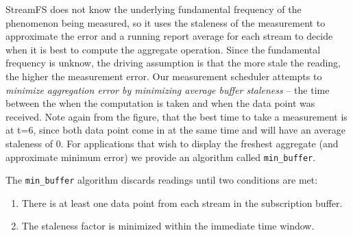 StreamFS does not know the underlying fundamental frequency of the phenomenon being measured, so it uses the staleness of the measurement to
approximate the error and a running report average for each stream to decide when it is best to compute the aggregate operation.  
Since the fundamental frequency is unknow, the driving assumption is that the more stale the reading, the higher the measurement error.  
Our measurement scheduler attempts to \emph{minimize aggregation error
by minimizing average buffer staleness} -- the time between the when the computation is taken and when the data point was received.  Note again
from the figure, that the best time to take a measurement is at t=6, since both data point come in at the same time and will have an average staleness
of 0.
For applications that wish to display the freshest aggregate (and approximate minimum error) we provide an algorithm
called \texttt{min\_buffer}.

The \texttt{min\_buffer} algorithm discards readings until two conditions are met:

\begin{enumerate}
\item There is at least one data point from each stream in the subscription buffer.
\item The staleness factor is minimized within the immediate time window.
\end{enumerate}

